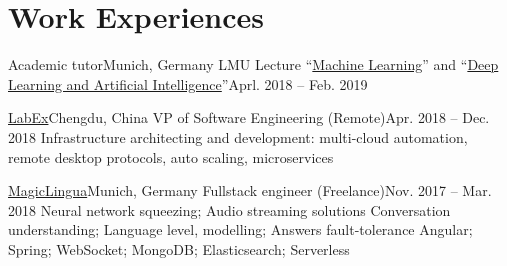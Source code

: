 \section{\textbf{Work Experiences}}
  \resumeSubHeadingListStart

    \resumeSubheading
      {Academic tutor}{Munich, Germany}
      {LMU Lecture ``\href{http://www.dbs.ifi.lmu.de/cms/studium_lehre/lehre_master/ml18/index.html}{Machine Learning}'' and ``\href{http://www.dbs.ifi.lmu.de/cms/studium_lehre/lehre_master/deep1819/index.html}{Deep Learning and Artificial Intelligence}''}{Aprl. 2018 -- Feb. 2019}
      \resumeItemListStart
      \resumeItemListEnd

    \resumeSubheading
      {\href{https://labex.io/}{LabEx}}{Chengdu, China}
      {VP of Software Engineering (Remote)}{Apr. 2018 -- Dec. 2018}
      \resumeItemListStart
        {
          Infrastructure architecting and development: 
          multi-cloud automation, remote desktop protocols, auto scaling, microservices
        }
      \resumeItemListEnd

    \resumeSubheading
    {\href{https://magiclingua.com/}{MagicLingua}}{Munich, Germany}
    {Fullstack engineer (Freelance)}{Nov. 2017 -- Mar. 2018}
    \resumeItemListStart
        {Neural network squeezing; Audio streaming solutions}
        {Conversation understanding; Language level, modelling; Answers fault-tolerance}
        {Angular; Spring; WebSocket; MongoDB; Elasticsearch; Serverless}
    \resumeItemListEnd

